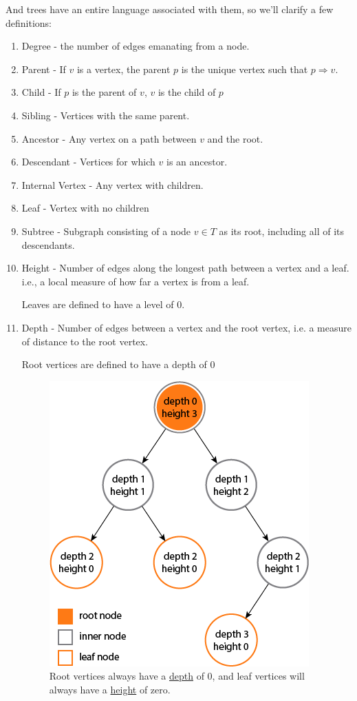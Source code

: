 \documentclass[a4paper,10pt]{report}
\begin{document}
And trees have an entire language associated with them, so we'll clarify a few definitions:
\begin{enumerate}
	\item Degree - the number of edges emanating from a node.
	\item Parent - If $v$ is a vertex, the parent $p$ is the unique vertex such that $p\Rightarrow v$.
	\item Child - If $p$ is the parent of $v$, $v$ is the child of $p$
	\item Sibling - Vertices with the same parent.
	\item Ancestor - Any vertex on a path between $v$ and the root.
	\item Descendant - Vertices for which $v$ is an ancestor.
	\item Internal Vertex - Any vertex with children.
	\item Leaf - Vertex with no children
	\item Subtree - Subgraph consisting of a node $v\in T$ as its root, including all of its descendants.
	\item Height - Number of edges along the longest path between a vertex and a leaf.
	i.e., a local measure of how far a vertex is from a leaf.

	Leaves are defined to have a level of 0.

	\item Depth - Number of edges between a vertex and the root vertex,
	i.e. a measure of distance to the root vertex.

	Root vertices are defined to have a depth of 0

		\begin{figure}[H]
		\begin{centering}
		\begin{center}
		\includegraphics[width=.5\linewidth]{./height-depth.png}
		\caption{Root vertices always have a \underline{depth} of 0, and leaf vertices will always have a \underline{height} of zero. }
		\label{fig:??????}
		\end{center}
		\par\end{centering}
		\end{figure}
\end{enumerate}
\end{document}
